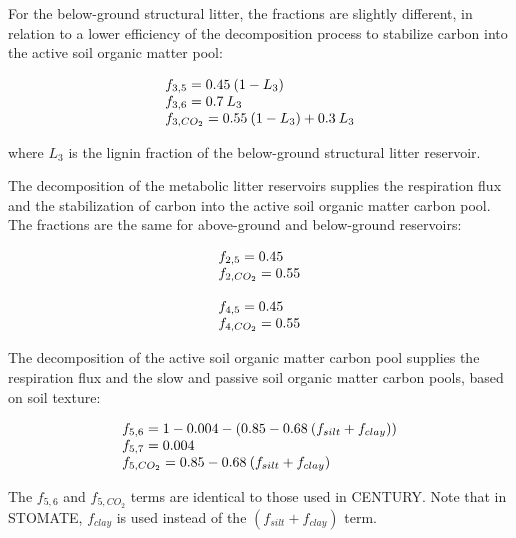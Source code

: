 {For the below-ground structural litter, the fractions are slightly different, in relation to 
a lower efficiency of the decomposition process to stabilize carbon into the active soil organic matter pool:

\begin{equation}
\begin{tabular}{l}
$ f_{3,5} = 0.45 \: ( 1 - L_3 ) $ \\
$ f_{3,6} = 0.7 \: L_3 $ \\
$ f_{3,CO_2} = 0.55 \: ( 1 - L_3 ) + 0.3 \: L_3 $ \\
\end{tabular}
\end{equation}

where $L_3$ is the lignin fraction of the below-ground structural litter reservoir.

The decomposition of the metabolic litter reservoirs supplies the respiration flux 
and the stabilization of carbon into the active soil organic matter carbon pool. 
The fractions are the same for above-ground and below-ground reservoirs:

\begin{equation}
\begin{tabular}{l}
$ f_{2,5} = 0.45 $ \\
$ f_{2,CO_2} = 0.55 $ \\
\\
$ f_{4,5} = 0.45 $ \\
$ f_{4,CO_2} = 0.55 $ \\
\end{tabular}
\end{equation}

The decomposition of the active soil organic matter carbon pool supplies the respiration flux 
and the slow and passive soil organic matter carbon pools, based on 
soil texture: 

\begin{equation}
\begin{tabular}{l}
$ f_{5,6} = 1 - 0.004 - ( 0.85 - 0.68 \: (f_{silt}+f_{clay}) ) $ \\
$ f_{5,7} = 0.004 $ \\
$ f_{5,CO_2} = 0.85 - 0.68 \: (f_{silt}+f_{clay}) $ \\
\end{tabular}
\end{equation}

The $f_{5,6}$ and $f_{5,CO_2}$ terms are identical to those used in CENTURY.
Note that in STOMATE, $f_{clay}$ is used instead of the $(f_{silt}+f_{clay})$ term. 

}
